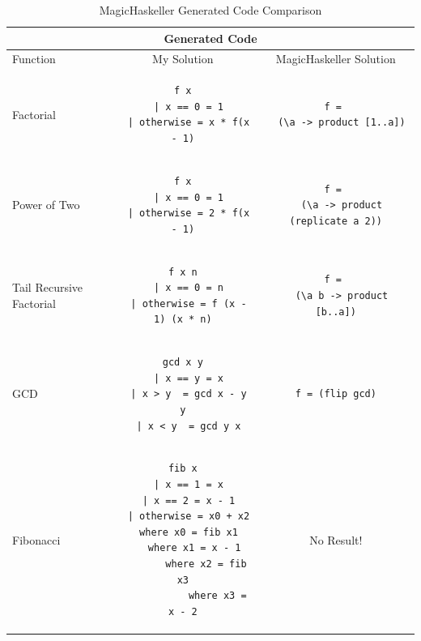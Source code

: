 \begin{table}[p!]
\centering
\begin{tabular}{| m{4em} | c | c |}
\hline
\multicolumn{3}{|c|}{\textbf{Generated Code}} \\
\hline
Function & My Solution & MagicHaskeller Solution \\
\hline
Factorial 
&
\begin{lstlisting}[backgroundcolor = \color{white}]
f x
  | x == 0 = 1
  | otherwise = x * f(x - 1)
\end{lstlisting}
& 
\begin{lstlisting}[backgroundcolor = \color{white}]
f = 
  (\a -> product [1..a])
\end{lstlisting}
\\
\hline
\mbox{}\newline
Power \newline
of \newline
Two \newline
&
\mbox{}\newline
\begin{lstlisting}[backgroundcolor = \color{white}]
f x
  | x == 0 = 1
  | otherwise = 2 * f(x - 1)
\end{lstlisting}
& 
\begin{lstlisting}[backgroundcolor = \color{white}]
f = 
  (\a -> product (replicate a 2))
\end{lstlisting}
\\
\hline
\mbox{}\newline
Tail \newline
Recursive \newline
Factorial \newline
&
\begin{lstlisting}[backgroundcolor = \color{white}]
f x n
  | x == 0 = n
  | otherwise = f (x - 1) (x * n)
\end{lstlisting}
& 
\begin{lstlisting}[backgroundcolor = \color{white}]
f = 
  (\a b -> product [b..a])
\end{lstlisting}
\\
\hline
GCD 
&
\begin{lstlisting}[backgroundcolor = \color{white}]
gcd x y
  | x == y = x
  | x > y  = gcd x - y y
  | x < y  = gcd y x
\end{lstlisting}	
&
\begin{lstlisting}[backgroundcolor = \color{white}]
f = (flip gcd)
\end{lstlisting}
\\
\hline
Fibonacci
&
\begin{lstlisting}[backgroundcolor = \color{white}]
fib x
  | x == 1 = x
  | x == 2 = x - 1
  | otherwise = x0 + x2
  where x0 = fib x1
  	where x1 = x - 1
  		where x2 = fib x3
  			where x3 = x - 2
\end{lstlisting}
&
No Result!
\\
\hline
\end{tabular}
\caption{MagicHaskeller Generated Code Comparison }
\label{table:1}
\end{table}
\Reactivatenumber

